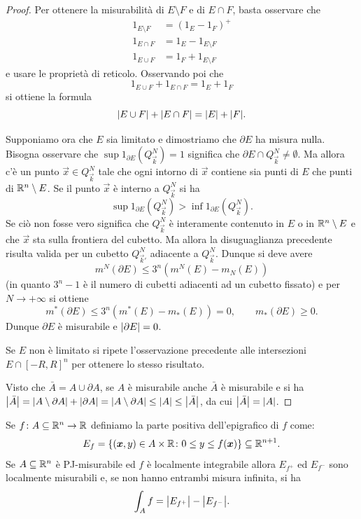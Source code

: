 \begin{proof}
Per ottenere la misurabilità di $E\setminus F$ e di $E\cap F$, basta osservare che 
\begin{align*}
  1_{E\setminus F} &= (1_E - 1_F)^+\\
  1_{E\cap F} &= 1_E - 1_{E\setminus F}\\
  1_{E\cup F} &= 1_F + 1_{E\setminus F}
\end{align*}
e usare le proprietà di reticolo.
Osservando poi che 
\[
  1_{E\cup F} + 1_{E\cap F} = 1_E + 1_F 
\]
si ottiene la formula
\[
  {\left|E\cup F\right|} + {\left|E\cap F\right|} = {\left|E\right|} + {\left|F\right|}.
\]

Supponiamo ora che $E$ sia limitato
e dimostriamo che $\partial E$ ha misura nulla.
Bisogna osservare 
che $\sup 1_{\partial E}(Q^N_{\vec k}) = 1$ 
significa che $\partial E\cap Q^N_{\vec k} \neq \emptyset$.
Ma allora c'è un punto $\vec x\in Q^N_{\vec k}$ tale che ogni intorno 
di $\vec x$ contiene sia punti di $E$ che punti di ${\mathbb R}^n\setminus E$.
Se il punto $\vec x$ è interno a $Q^N_{\vec k}$ si ha
\[
  \sup 1_{\partial E}(Q^N_{\vec k}) > \inf 1_{\partial E}(Q^N_{\vec k}).
\]
Se ciò non fosse vero significa che 
$Q^N_{\vec k}$ è interamente contenuto in $E$ o in ${\mathbb R}^n\setminus E$
e che $\vec x$ sta sulla frontiera del cubetto.
Ma allora la disuguaglianza precedente risulta valida 
per un cubetto $Q^N_{\vec k'}$ adiacente a $Q^N_{\vec k}$.
Dunque si deve avere 
\[
  m^N(\partial E)\le 3^n (m^N(E)-m_N(E))
\]
(in quanto $3^n-1$ è il numero di cubetti adiacenti ad un cubetto fissato)
e per $N\to +\infty$ si ottiene 
\[
  m^*(\partial E) \le 3^n (m^*(E)-m_*(E)) = 0, 
  \qquad 
  m_*(\partial E)\ge 0.
\]
Dunque $\partial E$ è misurabile e ${\left|\partial E\right|} = 0$.

Se $E$ non è limitato si ripete l'osservazione precedente alle intersezioni 
$E\cap [-R,R]^n$ per ottenere lo stesso risultato.

Visto che $\bar A = A \cup \partial A$, se $A$ è misurabile anche $\bar A$ è 
misurabile e si ha ${\left|\bar A\right|} = {\left|A\setminus \partial A\right|} + {\left|\partial A\right|}
= {\left|A \setminus \partial A\right|} \le {\left|A\right|} \le {\left|\bar A\right|}$,
da cui ${\left|\bar A\right|}={\left|A\right|}$.
\end{proof}

\begin{theorem}
  \label{th:significato-geometrico-integrale}
Se $f\colon A\subseteq {\mathbb R}^n \to {\mathbb R}$ definiamo la parte positiva dell'epigrafico di $f$
come:
\[
  E_f = {\left\{ (\boldsymbol x,y)\in A\times {\mathbb R} \colon 0 \le y \le f(\boldsymbol x) \right\}} \subseteq {\mathbb R}^{n+1}.
\]
Se $A\subseteq {\mathbb R}^n$ è PJ-misurabile ed $f$ è localmente integrabile 
allora $E_{f^+}$ ed $E_{f^-}$ sono localmente misurabili e, se non
hanno entrambi misura infinita, si ha 
\[
  \int_A f = {\left|E_{f^+}\right|} - {\left|E_{f^-}\right|}.
\]
\end{theorem}

